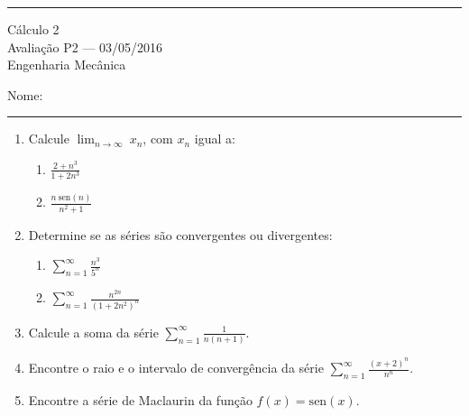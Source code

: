 \documentclass{article}
\newcommand{\ds}{\displaystyle}
\newcommand{\sen}{\mbox{sen}}
\begin{document}
\noindent{}\rule{\textwidth}{0.4pt}
\begin{center}
	C\'alculo 2\\
	Avalia\c{c}\~ao P2 --- 03/05/2016 \\
	Engenharia Mec\^anica \\
	\vspace{0.2cm}
\end{center}
Nome: \\
\noindent{}\rule{\textwidth}{0.4pt}

\begin{enumerate}
\item Calcule $\displaystyle\lim_{n\rightarrow\infty}\ x_n$, com $x_n$ igual a:
	\begin{enumerate}
		\item $\ds\frac{2+n^3}{1+2n^3}$
		\item $\ds\frac{n\ \sen(n)}{n^2+1}$
	\end{enumerate}

\item Determine se as s\'eries s\~ao convergentes ou divergentes:
	\begin{enumerate}
		\item $\ds\sum_{n=1}^\infty \frac{n^3}{5^n}$
		\item $\ds\sum_{n=1}^\infty \frac{n^{2n}}{(1+2n^2)^n}$
	\end{enumerate}

\item Calcule a soma da s\'erie $\ds\sum_{n=1}^\infty \frac{1}{n(n+1)}$.

\item Encontre o raio e o intervalo de converg\^encia da s\'erie
$\ds\sum_{n=1}^\infty \frac{(x+2)^n}{n^n}$.

\item Encontre a s\'erie de Maclaurin da fun\c{c}\~ao $f(x) = \sen(x)$.
	
\end{enumerate}
\end{document}
